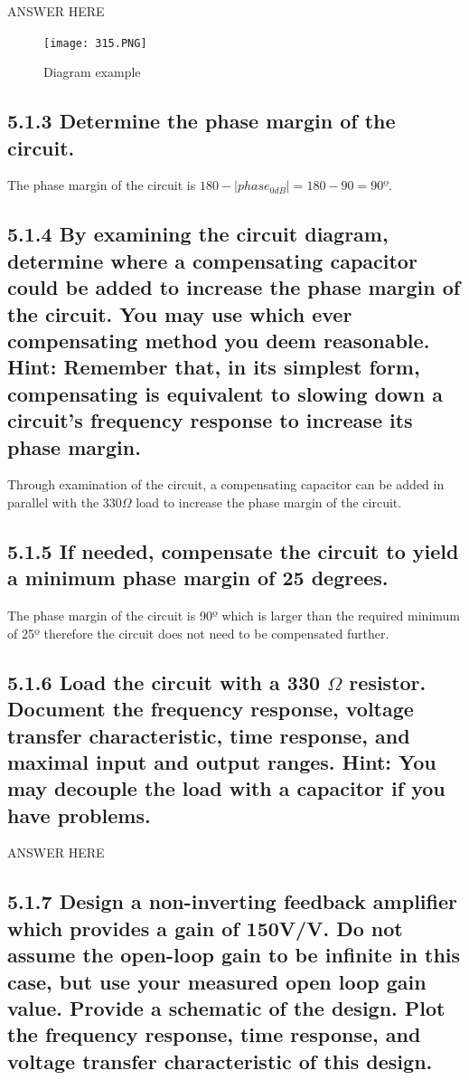 \documentclass[12pt]{article}
\begin{document}
ANSWER HERE

\begin{figure}[H]
    \centering
    \texttt{[image: 315.PNG]}
    \caption{Diagram example}
\end{figure}
    

\subsection*{5.1.3 Determine the phase margin of the circuit.}

The phase margin of the circuit is $180 -  |phase_{0dB}| = 180 - 90 = 90º$.

\subsection*{5.1.4 By examining the circuit diagram, determine where a 
compensating capacitor could be added to increase the phase margin of the circuit. 
You may use which ever compensating method you deem reasonable. Hint: Remember that, 
in its simplest form, compensating is equivalent to slowing down a circuit’s frequency 
response to increase its phase margin.}

Through examination of the circuit, a compensating capacitor can be added in parallel with the $330\Omega$ load to increase the phase margin of the circuit.

\subsection*{5.1.5 If needed, compensate the circuit to yield a minimum phase margin of 25 degrees.  }

The phase margin of the circuit is 90º which is larger than the required minimum of 25º therefore the circuit does not need to be compensated further.

\subsection*{5.1.6 Load the circuit with a 330 $\Omega$ resistor. Document the frequency response, 
voltage transfer characteristic, time response, and maximal input and output ranges. 
Hint: You may decouple the load with a capacitor if you have problems.}

ANSWER HERE

\subsection*{5.1.7 Design a non-inverting feedback amplifier which provides a gain of 150V/V. 
Do not assume the open-loop gain to be infinite in this case, but use your measured open loop 
gain value. Provide a schematic of the design. Plot the frequency response, time response, and 
voltage transfer characteristic of this design. }
\end{document}
